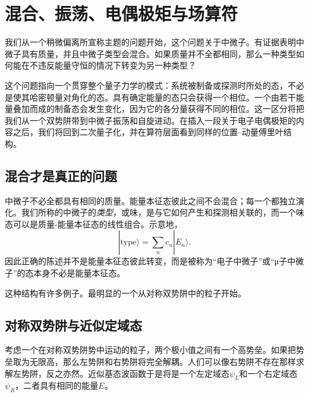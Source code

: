 \chapter{混合、振荡、电偶极矩与场算符}

我们从一个稍微偏离所宣称主题的问题开始，这个问题关于中微子。有证据表明中微子具有质量，并且中微子类型会混合。如果质量并不全都相同，那么一种类型如何能在不违反能量守恒的情况下转变为另一种类型？

这个问题指向一个贯穿整个量子力学的模式：系统被制备或探测时所处的态，不必是使其哈密顿量对角化的态。具有确定能量的态只会获得一个相位。一个由若干能量叠加而成的制备态会发生变化，因为它的各分量获得不同的相位。这一区分将把我们从一个双势阱带到中微子振荡和自旋进动。在插入一段关于电子电偶极矩的内容之后，我们将回到二次量子化，并在算符层面看到同样的位置--动量傅里叶结构。

\section{混合才是真正的问题}

中微子不必全都具有相同的质量。能量本征态彼此之间不会混合；每一个都独立演化。我们所称的中微子的\emph{类型}，或味，是与它如何产生和探测相关联的，而一个味态可以是质量-能量本征态的线性组合。示意地，
\begin{equation}
|\text{type}\rangle = \sum_n c_n |E_n\rangle .
\end{equation}
因此正确的陈述并不是能量本征态彼此转变，而是被称为``电子中微子''或``{\proseunicodefont μ}子中微子''的态本身不必是能量本征态。

\begin{classroomqa}
\end{classroomqa}

这种结构有许多例子。最明显的一个从对称双势阱中的粒子开始。

\section{对称双势阱与近似定域态}

考虑一个在对称双势阱势中运动的粒子，两个极小值之间有一个高势垒。如果把势垒取为无限高，那么左势阱和右势阱将完全解耦。人们可以像右势阱不存在那样求解左势阱，反之亦然。近似基态波函数于是将是一个左定域态\(\psi_L\)和一个右定域态\(\psi_R\)，二者具有相同的能量\(E\)。

